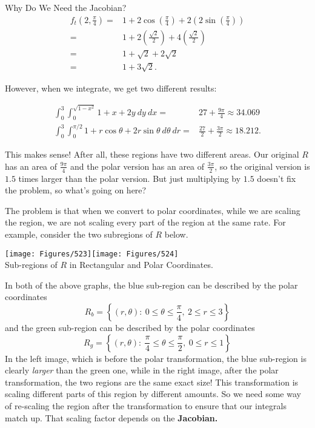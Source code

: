 \begin{example}{Why Do We Need the Jacobian?}
\begin{align*}
f_t\left(2,\frac{\pi}{4}\right)=&1+2\cos\left(\frac{\pi}{4}\right)+2\left(2\sin\left(\frac{\pi}{4}\right)\right)\\
=&1+2\left(\frac{\sqrt{2}}{2}\right)+4\left(\frac{\sqrt{2}}{2}\right)\\
=&1+\sqrt{2}+2\sqrt{2}\\
=&1+3\sqrt{2}.
\end{align*}

However, when we integrate, we get two different results:

\begin{align*}
\int_{0}^{3}\int_{0}^{\sqrt{1-x^2}} 1+x+2y\ dy\ dx=&27+\frac{9\pi}{4}\approx34.069\\
\int_{0}^{3}\int_{0}^{\pi/2}1+r\cos\theta+2r\sin\theta\ d\theta \ dr=&\frac{27}{2}+\frac{3\pi}{2}\approx18.212.
\end{align*}

This makes sense! After all, these regions have two different areas. Our original $R$ has an area of $\frac{9\pi}{4} $ and the polar version has an area of $\frac{3\pi}{2}$, so the original version is $1.5$ times larger than the polar version. But just multiplying by $1.5$ doesn't fix the problem, so what's going on here?

\vspace{1em}

The problem is that when we convert to polar coordinates, while we are scaling the region, we are not scaling every part of the region at the same rate. For example, consider the two subregions of $R$ below.

\vspace{1em}
\begin{center}
\texttt{[image: Figures/523]}\qquad \texttt{[image: Figures/524]}\\Sub-regions of $R$ in Rectangular and Polar Coordinates.
\end{center}
\vspace{1em}

In both of the above graphs, the blue sub-region can be described by the polar coordinates 
$$R_b=\left\{(r,\theta): \ 0\leq\theta\leq \frac{\pi}{4},\ 2\leq r\leq 3 \right\}$$ 
and the green sub-region can be described by the polar coordinates
$$R_g=\left\{(r,\theta): \ \frac{\pi}{4}\leq\theta\leq \frac{\pi}{2},\ 0\leq r\leq 1 \right\}$$ 
In the left image, which is before the polar transformation, the blue sub-region is clearly \textit{larger} than the green one, while in the right image, after the polar transformation, the two regions are the same exact size! This transformation is scaling different parts of this region by different amounts. So we need some way of re-scaling the region after the transformation to ensure that our integrals match up. That scaling factor depends on the \textbf{Jacobian.}
\end{example}

